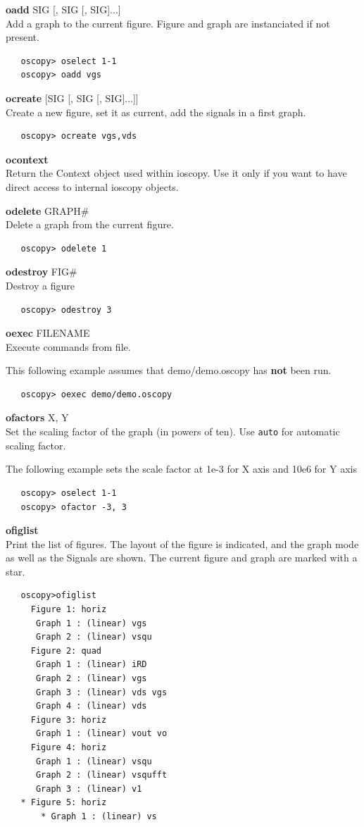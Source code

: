 \documentclass[a4paper,11pt]{article}
\begin{document}
\newcommand{\ocmd}[2]{{\large\vspace{5mm}\noindent\textbf{#1} #2\\}}

\ocmd{oadd}{SIG [, SIG [, SIG]...]}
   Add a graph to the current figure. Figure and graph are instanciated if not present.

\begin{verbatim}
   oscopy> oselect 1-1
   oscopy> oadd vgs
\end{verbatim}

\ocmd{ocreate}{[SIG [, SIG [, SIG]...]]}
   Create a new figure, set it as current, add the signals in a first graph.

\begin{verbatim}
   oscopy> ocreate vgs,vds
\end{verbatim}

\ocmd{ocontext}{\ }
   Return the Context object used within ioscopy.
 Use it only if you want to have direct access to internal ioscopy objects.

\ocmd{odelete}{GRAPH\#}
   Delete a graph from the current figure.

\begin{verbatim}
   oscopy> odelete 1
\end{verbatim}

\ocmd{odestroy}{FIG\#}
   Destroy a figure

\begin{verbatim}
   oscopy> odestroy 3
\end{verbatim}

\ocmd{oexec}{FILENAME}
   Execute commands from file.

   This following example assumes that demo/demo.oscopy has \textbf{not} been run.

\begin{verbatim}
   oscopy> oexec demo/demo.oscopy
\end{verbatim}

\ocmd{ofactors}{X, Y}
   Set the scaling factor of the graph (in powers of ten). Use \texttt{auto} for automatic scaling factor.

\noindent   The following example sets the scale factor at 1e-3 for X axis and 10e6 for Y axis
\begin{verbatim}
   oscopy> oselect 1-1
   oscopy> ofactor -3, 3
\end{verbatim}

\ocmd{ofiglist}{\ }
   Print the list of figures. The layout of the figure is indicated, and the graph mode as well as the Signals are shown. The current figure and graph are marked with a star.
\begin{verbatim}
   oscopy>ofiglist
     Figure 1: horiz
      Graph 1 : (linear) vgs
      Graph 2 : (linear) vsqu
     Figure 2: quad
      Graph 1 : (linear) iRD
      Graph 2 : (linear) vgs
      Graph 3 : (linear) vds vgs
      Graph 4 : (linear) vds
     Figure 3: horiz
      Graph 1 : (linear) vout vo
     Figure 4: horiz
      Graph 1 : (linear) vsqu
      Graph 2 : (linear) vsqufft
      Graph 3 : (linear) v1
   * Figure 5: horiz
       * Graph 1 : (linear) vs
\end{verbatim}
\end{document}
